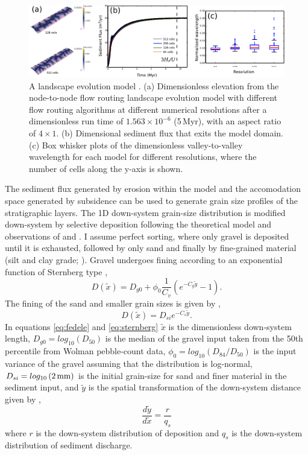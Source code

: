 \begin{figure}
\centering
\includegraphics[width=\textwidth]{./figures/ch2-MFD.pdf}
\caption{A landscape evolution model \citep[see][]{armitage-2019}. (a) Dimensionless elevation from the node-to-node flow routing landscape evolution model with different flow routing algorithms at different numerical resolutions after a dimensionless run time of $1.563\times10^{-6}$ (5\,Myr), with an aspect ratio of $4\times1$. (b) Dimensional sediment flux that exits the model domain. (c) Box whisker plots of the dimensionless valley-to-valley wavelength for each model for different resolutions, where the number of cells along the y-axis is shown.}
\label{fg:MFD}
\end{figure}

The sediment flux generated by erosion within the model and the accomodation space generated by subsidence can be used to generate grain size profiles of the stratigraphic layers. The 1D down-system grain-size distribution is modified down-system by selective deposition following the theoretical model and observations of \cite{fedele-2007} and \cite{duller-etal-2010}. I assume perfect sorting, where only gravel is deposited until it is exhausted, followed by only sand and finally by fine-grained material (silt and clay grade; \citealp{paola-etal-1992}). Gravel undergoes fining according to an exponential function of Sternberg type \citep{fedele-2007,duller-etal-2010},
\begin{equation}
D(\tilde{x}) = D_{g0} + \phi_{0}\frac{1}{C_{v}}\left( e^{-C_{g}\tilde{y}}-1 \right).
\label{eq-fedele}
\end{equation}
The fining of the sand and smaller grain sizes is given by \cite{sternberg-1875},
\begin{equation}
D(\tilde{x}) = D_{si}e^{-C_{s}\tilde{y}}.
\label{eq-sternberg}
\end{equation}
In equations \ref{eq:fedele} and \ref{eq:sternberg} $\tilde{x}$ is the dimensionless down-system length, $D_{g0} = log_{10}\left(D_{50}\right)$ is the median of the gravel input taken from the 50th percentile from Wolman pebble-count data, $\phi_{0} = log_{10}\left( D_{84}/D_{50} \right)$ is the input variance of the gravel assuming that the distribution is log-normal, $D_{si} = log_{10}\left( 2\,{\rm mm} \right)$ is the initial grain-size for sand and finer material in the sediment input, and $\tilde{y}$ is the spatial transformation of the down-system distance given by \citep{paola-1995},
\begin{equation}
\frac{d\tilde{y}}{d\tilde{x}} = \frac{r}{q_{s}}
\end{equation}
where $r$ is the down-system distribution of deposition and $q_{s}$ is the down-system distribution of sediment discharge.

